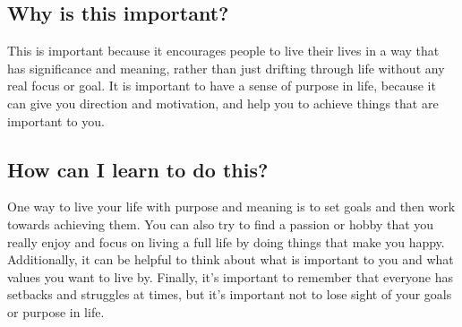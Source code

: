 \documentclass[11pt]{article}
\begin{document}
\subsection{Why is this important?}
\label{sec:orgfadd92b}
This is important because it encourages people to live their lives in a way that has significance and meaning, rather than just drifting through life without any real focus or goal. It is important to have a sense of purpose in life, because it can give you direction and motivation, and help you to achieve things that are important to you.

\subsection{How can I learn to do this?}
\label{sec:org388fcab}
One way to live your life with purpose and meaning is to set goals and then work towards achieving them. You can also try to find a passion or hobby that you really enjoy and focus on living a full life by doing things that make you happy. Additionally, it can be helpful to think about what is important to you and what values you want to live by. Finally, it's important to remember that everyone has setbacks and struggles at times, but it's important not to lose sight of your goals or purpose in life.
\end{document}
